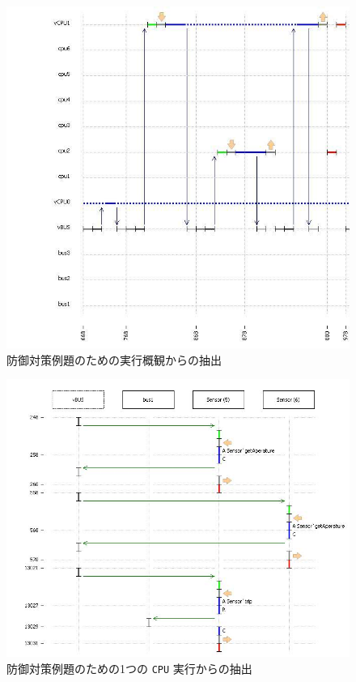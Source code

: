 \documentclass[\pformat,12pt]{jreport}
\begin{document}
\begin{figure}
\begin{center}
\includegraphics[width=\textwidth]{exeoverview}
\end{center}
\caption{防御対策例題のための実行概観からの抽出\label{fig:exeoverview}}
\end{figure}

\begin{figure}
\begin{center}
\includegraphics[width=\textwidth]{detailedexe}
\end{center}
\caption{防御対策例題のための1つの \texttt{CPU} 実行からの抽出\label{fig:detailedexe}}
\end{figure}
\end{document}
